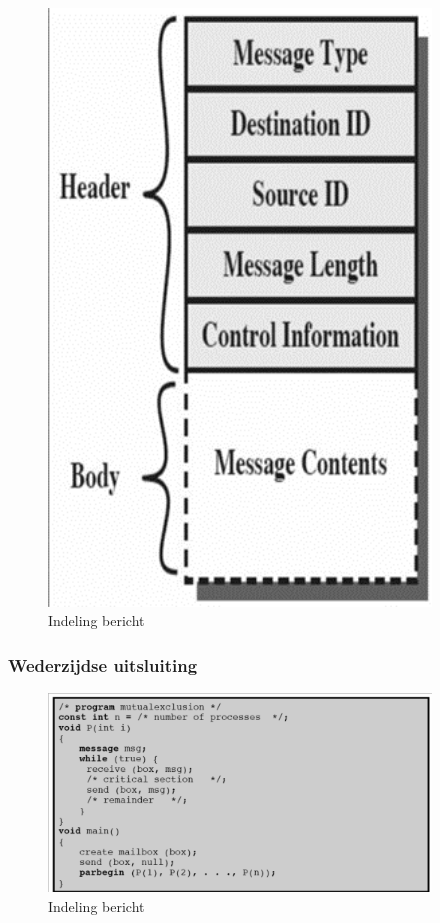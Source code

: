 \begin{figure}[htp]
    \centering
            \includegraphics[width=4in]{img/indelingbericht.png}
        \caption{Indeling bericht}
    \label{fig:Indeling bericht}
\end{figure}


\newpage


\subsubsection{Wederzijdse uitsluiting}

\begin{figure}[htp]
    \centering
            \includegraphics[width=4in]{img/mutualexclusionmessage.png}
        \caption{Indeling bericht}
    \label{fig:Indeling bericht}
\end{figure}

